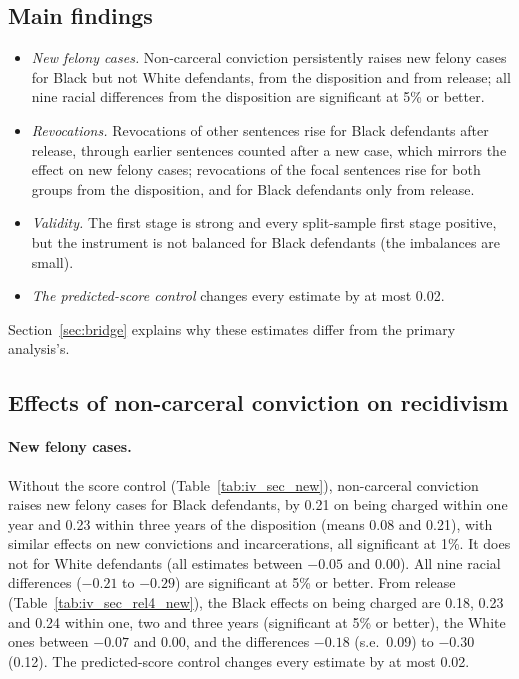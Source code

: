 \documentclass[11pt]{article}
\begin{document}
\subsection{Main findings}

\begin{itemize}
  \item \emph{New felony cases.} Non-carceral conviction persistently raises new felony cases for Black but not White defendants, from the disposition and from release; all nine racial differences from the disposition are significant at 5\% or better.
  \item \emph{Revocations.} Revocations of other sentences rise for Black defendants after release, through earlier sentences counted after a new case, which mirrors the effect on new felony cases; revocations of the focal sentences rise for both groups from the disposition, and for Black defendants only from release.
  \item \emph{Validity.} The first stage is strong and every split-sample first stage positive, but the instrument is not balanced for Black defendants (the imbalances are small).
  \item \emph{The predicted-score control} changes every estimate by at most 0.02.
\end{itemize}
Section~\ref{sec:bridge} explains why these estimates differ from the primary analysis's.

\subsection{Effects of non-carceral conviction on recidivism}

\paragraph{New felony cases.} Without the score control (Table~\ref{tab:iv_sec_new}), non-carceral conviction raises new felony cases for Black defendants, by 0.21 on being charged within one year and 0.23 within three years of the disposition (means 0.08 and 0.21), with similar effects on new convictions and incarcerations, all significant at 1\%. It does not for White defendants (all estimates between $-0.05$ and 0.00). All nine racial differences ($-0.21$ to $-0.29$) are significant at 5\% or better. From release (Table~\ref{tab:iv_sec_rel4_new}), the Black effects on being charged are 0.18, 0.23 and 0.24 within one, two and three years (significant at 5\% or better), the White ones between $-0.07$ and 0.00, and the differences $-0.18$ (s.e.\ 0.09) to $-0.30$ (0.12). The predicted-score control changes every estimate by at most 0.02.
\end{document}
